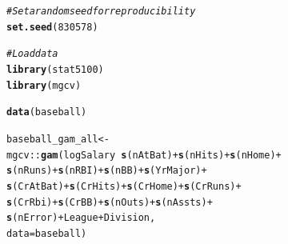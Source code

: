 \documentclass{article}\usepackage[]{graphicx}\usepackage[]{color}
\makeatletter
\newcommand{\hlnum}[1]{\textcolor[rgb]{0.686,0.059,0.569}{#1}}%
\newcommand{\hlcom}[1]{\textcolor[rgb]{0.678,0.584,0.686}{\textit{#1}}}%
\newcommand{\hlopt}[1]{\textcolor[rgb]{0,0,0}{#1}}%
\newcommand{\hlstd}[1]{\textcolor[rgb]{0.345,0.345,0.345}{#1}}%
\newcommand{\hlkwb}[1]{\textcolor[rgb]{0.69,0.353,0.396}{#1}}%
\newcommand{\hlkwc}[1]{\textcolor[rgb]{0.333,0.667,0.333}{#1}}%
\newcommand{\hlkwd}[1]{\textcolor[rgb]{0.737,0.353,0.396}{\textbf{#1}}}%
\newenvironment{kframe}{%
 \def\at@end@of@kframe{}%
 \ifinner\ifhmode%
  \def\at@end@of@kframe{\end{minipage}}%
  \begin{minipage}{\columnwidth}%
 \fi\fi%
 \def\FrameCommand##1{\hskip\@totalleftmargin \hskip-\fboxsep
 \colorbox{shadecolor}{##1}\hskip-\fboxsep
     \hskip-\linewidth \hskip-\@totalleftmargin \hskip\columnwidth}%
 \MakeFramed {\advance\hsize-\width
   \@totalleftmargin\z@ \linewidth\hsize
   \@setminipage}}%
 {\par\unskip\endMakeFramed%
 \at@end@of@kframe}
\newenvironment{knitrout}{}{} %
\makeatother
\begin{document}
\begin{knitrout}
\color{fgcolor}\begin{kframe}
\begin{alltt}
\hlcom{# Set a random seed for reproducibility}
\hlkwd{set.seed}\hlstd{(}\hlnum{830578}\hlstd{)}

\hlcom{# Load data}
\hlkwd{library}\hlstd{(stat5100)}
\hlkwd{library}\hlstd{(mgcv)}
\end{alltt}


{\ttfamily\noindent\itshape\color{messagecolor}{\#\# Loading required package: nlme}}

{\ttfamily\noindent\itshape{}}\begin{alltt}
\hlkwd{data}\hlstd{(baseball)}

\hlstd{baseball_gam_all} \hlkwb{<-}
  \hlstd{mgcv}\hlopt{::}\hlkwd{gam}\hlstd{(logSalary} \hlopt{~} \hlkwd{s}\hlstd{(nAtBat)} \hlopt{+} \hlkwd{s}\hlstd{(nHits)} \hlopt{+} \hlkwd{s}\hlstd{(nHome)} \hlopt{+}
             \hlkwd{s}\hlstd{(nRuns)} \hlopt{+} \hlkwd{s}\hlstd{(nRBI)} \hlopt{+} \hlkwd{s}\hlstd{(nBB)} \hlopt{+} \hlkwd{s}\hlstd{(YrMajor)} \hlopt{+}
             \hlkwd{s}\hlstd{(CrAtBat)} \hlopt{+} \hlkwd{s}\hlstd{(CrHits)} \hlopt{+} \hlkwd{s}\hlstd{(CrHome)} \hlopt{+} \hlkwd{s}\hlstd{(CrRuns)} \hlopt{+}
             \hlkwd{s}\hlstd{(CrRbi)} \hlopt{+} \hlkwd{s}\hlstd{(CrBB)} \hlopt{+} \hlkwd{s}\hlstd{(nOuts)} \hlopt{+} \hlkwd{s}\hlstd{(nAssts)} \hlopt{+}
             \hlkwd{s}\hlstd{(nError)} \hlopt{+} \hlstd{League} \hlopt{+} \hlstd{Division,}
                         \hlkwc{data} \hlstd{= baseball)}


\end{alltt}
\end{kframe}
\end{knitrout}
\end{document}
